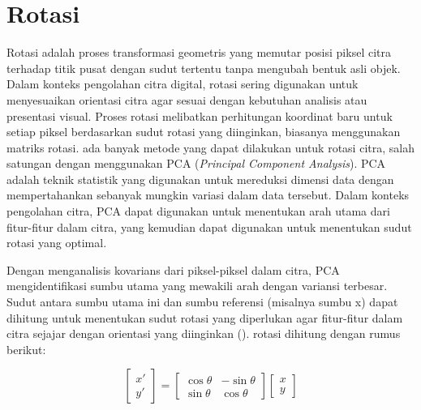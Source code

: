

\section{Rotasi}
  Rotasi adalah proses transformasi geometris yang memutar posisi piksel citra terhadap titik pusat dengan sudut tertentu tanpa mengubah bentuk asli objek. Dalam konteks pengolahan citra digital, rotasi sering digunakan untuk menyesuaikan orientasi citra agar sesuai dengan kebutuhan analisis atau presentasi visual. Proses rotasi melibatkan perhitungan koordinat baru untuk setiap piksel berdasarkan sudut rotasi yang diinginkan, biasanya menggunakan matriks rotasi.
ada banyak metode yang dapat dilakukan untuk rotasi citra, salah satungan dengan menggunakan PCA (\emph{Principal Component Analysis}). PCA adalah teknik statistik yang digunakan untuk mereduksi dimensi data dengan mempertahankan sebanyak mungkin variasi dalam data tersebut. Dalam konteks pengolahan citra, PCA dapat digunakan untuk menentukan arah utama dari fitur-fitur dalam citra, yang kemudian dapat digunakan untuk menentukan sudut rotasi yang optimal. 

  Dengan menganalisis kovarians dari piksel-piksel dalam citra, PCA mengidentifikasi sumbu utama yang mewakili arah dengan variansi terbesar. Sudut antara sumbu utama ini dan sumbu referensi (misalnya sumbu x) dapat dihitung untuk menentukan sudut rotasi yang diperlukan agar fitur-fitur dalam citra sejajar dengan orientasi yang diinginkan (\cite{ITJolliffe2002}).
rotasi dihitung dengan rumus berikut:

\begin{equation}
  \begin{bmatrix}
    x' \\
    y'
  \end{bmatrix}
  =
  \begin{bmatrix}
    \cos\theta & -\sin\theta \\
    \sin\theta & \cos\theta
  \end{bmatrix}
  \begin{bmatrix}
    x \\
    y
  \end{bmatrix}
  \label{eq:rotasi}
\end{equation}

